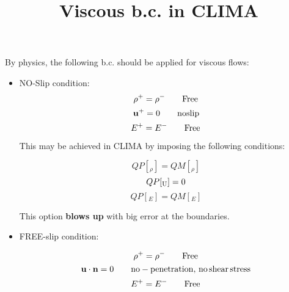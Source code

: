 \documentclass[9pt]{article}
\theoremstyle{remark}
\begin{document}
\title{\bf Viscous b.c. in CLIMA}

\author[]{}
\date{}

\maketitle

By physics, the following b.c. should be applied for viscous flows:

\begin{itemize}
\item NO-Slip condition:
    \begin{equation}
    \rho^+ = \rho^- \quad\quad {\rm Free}
    \end{equation}
    \begin{equation}
    {\bf u}^+ = 0 \quad\quad {\rm no slip}
    \end{equation}
    \begin{equation}
    E^+ = E^- \quad\quad {\rm Free}
    \end{equation}
    
    This may be achieved in CLIMA by imposing the following conditions:
    
    \begin{equation}
    QP[_\rho]= QM[_\rho]
    \end{equation}
    \begin{equation}
    QP[{\rm _U}] = 0
    \end{equation}
    \begin{equation}
    QP[_E] = QM[_E] 
    \end{equation}
    
{\color{red}This option {\bf blows up} with big error at the boundaries.}

\item FREE-slip condition:

    \begin{equation}
    \rho^+ = \rho^- \quad\quad {\rm Free}
    \end{equation}
    \begin{equation}
    {\bf u}\cdot{\bf n} = 0 \quad\quad {\rm no-penetration,\,no\,shear\,stress}
    \end{equation}
    \begin{equation}
    E^+ = E^- \quad\quad {\rm Free}
    \end{equation}
    

\end{itemize}
\end{document}
